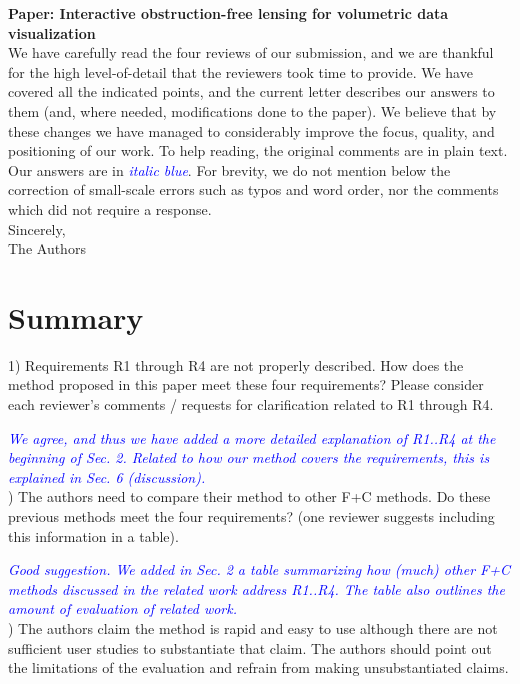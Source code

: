 \documentclass[a4paper,10pt]{article}
\newcommand{\rr}[1]{\emph{\textcolor{blue}{#1}}}
\begin{document}
\noindent\textbf{Paper: Interactive obstruction-free lensing for volumetric data visualization}\\

We have carefully read the four reviews of our submission, and we are thankful for the high level-of-detail that the reviewers took time to provide. We have covered all the
indicated points, and the current letter describes our answers to them (and, where needed, modifications done to the paper). We believe that by these changes we have managed to considerably improve the focus, quality, and positioning
of our work. To help reading, the original comments are in plain text. Our answers are in \rr{italic blue}. For brevity, we do not mention below the correction of small-scale errors such as typos and word order, nor the comments which did not require a response.\\

\noindent Sincerely,\\
The Authors\\


\section{Summary}


    1) Requirements R1 through R4 are not properly described. How does the method
    proposed in this paper meet these four requirements? Please consider each
    reviewer's comments / requests for clarification related to R1 through R4.
    
    \rr{We agree, and thus we have added a more detailed explanation of R1..R4 at the beginning of Sec. 2. Related to how our method covers the requirements, this is explained in Sec. 6 (discussion).}\\

) The authors need to compare their method to other F+C methods. Do these
    previous methods meet the four requirements? (one reviewer suggests including this
    information in a table).
    
    \rr{Good suggestion. We added in Sec. 2 a table summarizing how (much) other F+C methods discussed in the related work address R1..R4. The table also outlines the amount of evaluation of related work.}\\

) The authors claim the method is rapid and easy to use although there are not sufficient user studies to substantiate that claim. The authors should point out the limitations of the evaluation and refrain from making unsubstantiated claims.
\end{document}
